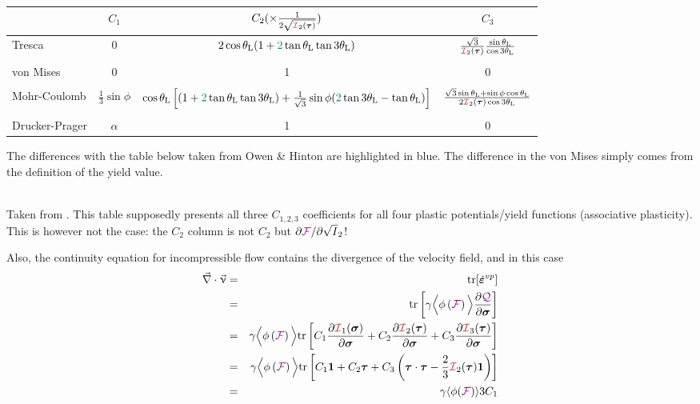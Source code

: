 \begin{center}
\begin{footnotesize}
\begin{tabular}{lccc}
\hline
& $C_1$ & $C_2(\times \frac{1}{2 \sqrt{{\III}_2({\bm \tau})}})$ & $C_3$ \\
              \hline\hline
Tresca         &0 & $2 \cos\theta_{\rm L} ( 1 + {\color{teal}2} \tan\theta_{\rm L}  \tan 3\theta_{\rm L})$ &
$\frac{\sqrt{3}}{{\III}_2({\bm \tau}) } \frac{\sin\theta_{\rm L} }{\cos 3\theta_{\rm L}}$
\\ \\
von Mises      &0& {\color{teal}1}& 0 \\ \\ 
Mohr-Coulomb   & $\frac13 \sin\phi$ & 
$
\cos \theta_{\rm L} \left[
(1 +  {\color{teal}2}\tan \theta_{\rm L}   \tan 3\theta_{\rm L})
+\frac{1}{\sqrt{3}} \sin\phi
( {\color{teal}2}\tan 3\theta_{\rm L} - \tan\theta_{\rm L}) \right]$
&
$\frac{\sqrt{3}\sin\theta_{\rm L} +  \sin \phi \cos \theta_{\rm L}}
{2 {\III}_2({\bm \tau}) \cos 3\theta_{\rm L}}$ 
\\ \\
Drucker-Prager & $\alpha$ & 1 & 0 \\  
\hline
\end{tabular}
\end{footnotesize}
\end{center}
The differences with the table below  taken from Owen \& Hinton \cite{owhi} are highlighted in blue.
The difference in the von Mises simply comes from the definition of the 
yield value.

\begin{center}
\\
{\captionfont Taken from \cite{owhi}.
This table supposedly presents all three $C_{1,2,3}$ coefficients 
for all four plastic potentials/yield functions (associative plasticity).
This is however not the case: the $C_2$ column is not $C_2$ but 
$\partial {\color{violet}\cal F}/\partial\sqrt I_2$!
}
\end{center}


Also, the continuity equation for incompressible flow contains the divergence 
of the velocity field, and in this case 
\begin{eqnarray}
\vec\nabla\cdot\vec\upnu 
&=& {\rm tr}[\dot{\bm\varepsilon}^{vp}]  \nn\\
&=& {\rm tr}\left[ 
\gamma \Big\langle
\phi\left( {\FFF} \right) 
\Big\rangle
\frac{\partial \QQQ}{\partial \bm\sigma}
\right] \nn\\
&=& 
\gamma \Big\langle
\phi\left( {\FFF} \right) 
\Big\rangle
{\rm tr}\left[
C_1  \frac{\partial {\III}_1(\bm\sigma)}{\partial \bm\sigma} 
+
C_2  \frac{\partial {\III}_2(\bm\tau)}{\partial \bm\sigma} 
+
C_3  \frac{\partial {\III}_3(\bm\tau)}{\partial \bm\sigma} 
\right] \nn\\
&=&
\gamma \Big\langle
\phi\left( {\FFF} \right) 
\Big\rangle
{\rm tr}\left[
C_1 {\bm 1} 
+
C_2 {\bm \tau} 
+
C_3  \left( \bm\tau\cdot\bm\tau - \frac23  {\III}_2(\bm\tau)  {\bm 1} \right)
\right] \nn\\
&=&  \gamma \langle \phi(\FFF) \rangle  3 C_1
\end{eqnarray}

